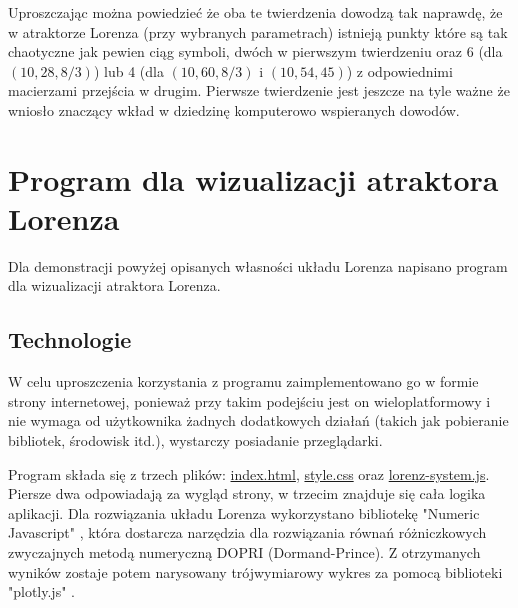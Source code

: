 \documentclass[12pt]{report}
\begin{document}
	\par Uproszczając można powiedzieć że oba te twierdzenia dowodzą tak naprawdę, że w atraktorze Lorenza (przy wybranych parametrach) istnieją punkty które są tak chaotyczne jak pewien ciąg symboli, dwóch w pierwszym twierdzeniu oraz 6 (dla $(10, 28, 8/3)$) lub 4 (dla $(10, 60, 8/3)$ i $(10, 54, 45)$) z odpowiednimi macierzami przejścia w drugim. Pierwsze twierdzenie jest jeszcze na tyle ważne że wniosło znaczący wkład w dziedzinę komputerowo wspieranych dowodów.

\chapter{Program dla wizualizacji atraktora Lorenza}
	\par Dla demonstracji powyżej opisanych własności układu Lorenza napisano program dla wizualizacji atraktora Lorenza.
	
	\section{Technologie}
	\par W celu uproszczenia korzystania z programu zaimplementowano go w formie strony internetowej, ponieważ przy takim podejściu  jest on wieloplatformowy i nie wymaga od użytkownika żadnych dodatkowych działań (takich jak pobieranie bibliotek, środowisk itd.), wystarczy posiadanie przeglądarki.
	
	\par Program składa się z trzech plików: \hyperref[sec:html]{index.html}, \hyperref[sec:css]{style.css} oraz \hyperref[sec:js]{lorenz-system.js}. Piersze dwa odpowiadają za wygląd strony, w trzecim znajduje się cała logika aplikacji. Dla rozwiązania układu Lorenza wykorzystano bibliotekę "Numeric Javascript" \cite{NumJS}, która dostarcza narzędzia dla rozwiązania równań różniczkowych zwyczajnych metodą numeryczną DOPRI (Dormand-Prince). Z otrzymanych wyników zostaje potem narysowany trójwymiarowy wykres za pomocą biblioteki "plotly.js" \cite{Plotly}.
	
\end{document}
